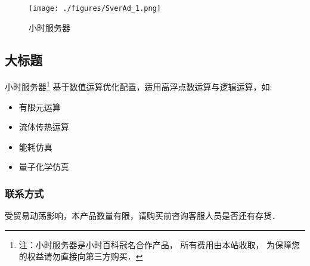 
\begin{issues}
\issueDraft
\end{issues}

\begin{figure}[ht]
\centering
\texttt{[image: ./figures/SverAd\_1.png]}
\caption{小时服务器}\label{SverAd_fig1}
\end{figure}

\subsection{大标题}

小时服务器\footnote{注：小时服务器是小时百科冠名合作产品， 所有费用由本站收取， 为保障您的权益请勿直接向第三方购买．} 基于数值运算优化配置，适用高浮点数运算与逻辑运算，如:
\begin{itemize}
\item 有限元运算
\item 流体传热运算
\item 能耗仿真
\item 量子化学仿真
\end{itemize}

\subsubsection{联系方式}

受贸易动荡影响，本产品数量有限，请购买前咨询客服人员是否还有存货．
